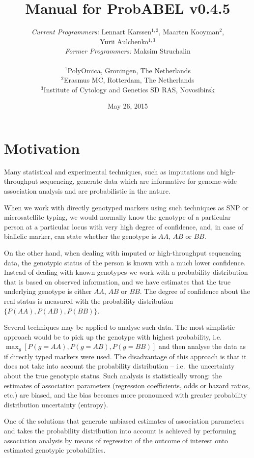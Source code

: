 \documentclass[12pt,a4paper]{article}
\title{Manual for ProbABEL v0.4.5}
\author{\emph{Current Programmers:} Lennart Karssen$^{1,2}$, Maarten
  Kooyman$^2$, \\
  Yurii Aulchenko$^{1,3}$ \\
  \emph{Former Programmers:} Maksim Struchalin
  \\
  \\
  $^{1}${\small PolyOmica, Groningen, The Netherlands} \\
  $^{2}${\small Erasmus MC, Rotterdam, The Netherlands}\\
  $^{3}${\small Institute of Cytology and Genetics SD RAS, Novosibirsk}
}
\date{May 26, 2015}
\begin{document}
\maketitle
\tableofcontents


\section{Motivation}

Many statistical and experimental techniques, such as imputations and
high-throughput sequencing, generate data which are informative for
genome-wide association analysis and are probabilistic in the nature.

When we work with directly genotyped markers using such techniques as
SNP or microsatellite typing, we would normally know the genotype of
a particular person at a particular locus with very high degree of
confidence, and, in case of biallelic marker, can state whether
the genotype is $AA$, $AB$ or $BB$.

On the other hand, when dealing with imputed or high-throughput
sequencing data, the genotypic status of the person is known with a
much lower confidence. Instead of dealing with
known genotypes we work with a probability distribution that is based
on observed information, and we have estimates that the true underlying
genotype is either $AA$, $AB$ or $BB$. The degree of confidence about
the real status is measured with the probability distribution
$\{P(AA), P(AB), P(BB)\}$.

Several techniques may be applied to analyse such data. The most
simplistic approach would be to pick up the genotype with highest
probability, i.e.~$\max_g[P(g=AA), P(g=AB), P(g=BB)]$ and then
analyse the data as if directly typed markers were used. The
disadvantage of this approach is that it does not take into
account the probability distribution -- i.e.~the uncertainty
about the true genotypic status. Such
analysis is statistically wrong: the estimates of association
parameters (regression coefficients, odds or hazard ratios, etc.)
are biased, and the bias becomes more pronounced with greater
probability distribution uncertainty (entropy).

One of the solutions that generate unbiased estimates
of association parameters and takes the
probability distribution into account is achieved by
performing association analysis by means of regression of the
outcome of interest onto estimated genotypic probabilities.
\end{document}
